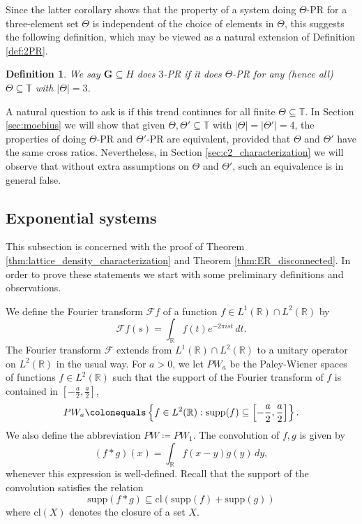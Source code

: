 \documentclass[reqno,a4paper,11pt]{amsart}
\numberwithin{equation}{section}
\newtheorem{definition}{Definition}[section]
\def\R{{\mathbb R}}
\def\T{{\mathbb T}}
\newcommand{\supp}{{\mathrm{supp}}}
\newcommand{\lt}{{L^2(\R)}}
\newcommand\1{\mathds{1}}
\newcommand{\ft}{{\mathcal{F}}}
\begin{document}
Since the latter corollary shows that the property of a system doing $\Theta$-PR for a three-element set $\Theta$ is independent of the choice of elements in $\Theta$, this suggests the following definition, which may be viewed as a natural extension of Definition \ref{def:2PR}.

\begin{definition}
    We say $\mathbf{G}\subseteq H$ does $3$-PR if it does $\Theta$-PR for any (hence all) $\Theta\subseteq \T$ with $|\Theta|=3$.
\end{definition}

A natural question to ask is if this trend continues for all finite $\Theta\subseteq \T$. In Section \ref{sec:moebius} we will show that given $\Theta,\Theta'\subseteq\T$ with $|\Theta|=|\Theta'|=4$, the properties of doing $\Theta$-PR and $\Theta'$-PR are equivalent, provided that $\Theta$ and $\Theta'$ have the same cross ratios. Nevertheless, in Section \ref{sec:c2_characterization} we will observe that without extra assumptions on $\Theta$ and $\Theta'$, such an equivalence is in general false.

\subsection{Exponential systems}

This subsection is concerned with the proof of Theorem \ref{thm:lattice_density_characterization} and Theorem \ref{thm:ER_disconnected}. In order to prove these statements we start with some preliminary definitions and observations.

We define the Fourier transform $\ft f$ of a function $f \in L^1(\R) \cap \lt$ by
$$
\ft f(s) = \int_\R f(t) e^{-2\pi i s t} \, dt.
$$
The Fourier transform $\ft$ extends from $L^1(\R) \cap \lt$ to a unitary operator on $\lt$ in the usual way.
For $a >0$, we let $PW_a$ be the Paley-Wiener spaces of functions $f \in \lt$ such that the support of the Fourier transform of $f$ is contained in $[-\frac{a}{2},\frac{a}{2}]$,
$$
PW_a \colonequals \left \{ f \in \lt : \supp(f) \subseteq \left [-\frac{a}{2},\frac{a}{2} \right ] \right \}.
$$
We also define the abbreviation $PW \coloneqq PW_1$. The convolution of $f,g$ is given by
$$
(f * g)(x) = \int_\R f(x-y) g(y) \, dy,
$$
whenever this expression is well-defined. Recall that the support of the convolution satisfies the relation
$$
\supp(f * g) \subseteq \mathrm{cl} ( \supp(f) + \supp(g) )
$$
where $\mathrm{cl}(X)$ denotes the closure of a set $X$.
\end{document}
